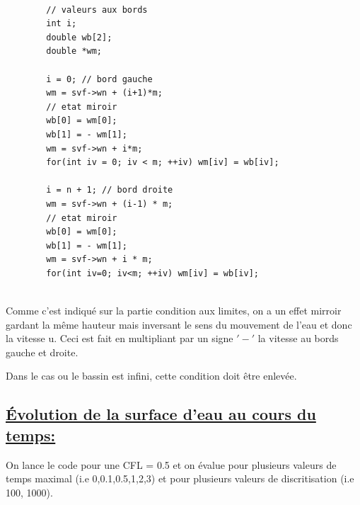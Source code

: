 \begin{lstlisting}

	    // valeurs aux bords
        int i;
        double wb[2];
        double *wm;

        i = 0; // bord gauche
        wm = svf->wn + (i+1)*m;
        // etat miroir
        wb[0] = wm[0];
        wb[1] = - wm[1];
        wm = svf->wn + i*m;
        for(int iv = 0; iv < m; ++iv) wm[iv] = wb[iv];

        i = n + 1; // bord droite
        wm = svf->wn + (i-1) * m;
        // etat miroir
        wb[0] = wm[0];
        wb[1] = - wm[1];
        wm = svf->wn + i * m;
        for(int iv=0; iv<m; ++iv) wm[iv] = wb[iv];
        
\end{lstlisting}

Comme c'est indiqu\'e sur la partie condition aux limites, on a un effet mirroir gardant la m\^eme hauteur mais inversant le sens du mouvement de l'eau et donc la vitesse u. Ceci est fait en multipliant par un signe $'-'$ la vitesse au bords gauche et droite. 

Dans le cas ou le bassin est infini, cette condition doit \^etre enlev\'ee.

\subsection[\'Evolution de la surface d’eau au cours du temps]{\uline{\'Evolution de la surface d’eau au cours du temps:}}

On lance le code pour une CFL = 0.5 et on \'evalue pour plusieurs valeurs de temps maximal (i.e 0,0.1,0.5,1,2,3) et pour plusieurs valeurs de discritisation (i.e 100, 1000).

